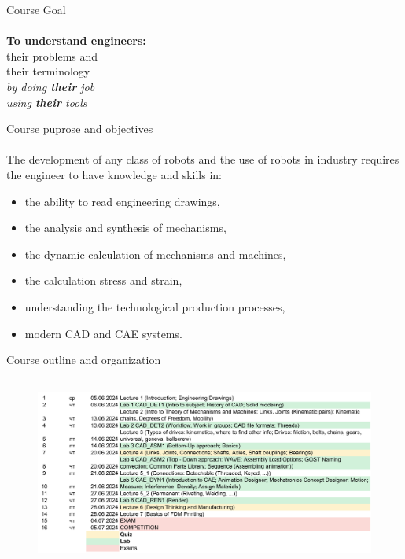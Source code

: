 \documentclass[aspectratio=169]{beamer}
\begin{document}
\begin{frame}[c]{Course Goal}
    \framesubtitle{}
    \centering \Large
    \textbf{To understand engineers:} \\
    their problems and \\
    their terminology \\
    \medskip
    \textit{by doing \textbf{their} job} \\
    \textit{using \textbf{their} tools}
\end{frame}

\begin{frame}[t]{Course puprose and objectives}
    \framesubtitle{}
    The development of any class of robots and the use of robots in industry requires the engineer to have knowledge and skills in:
    \begin{itemize}
        \item the ability to read engineering drawings,
        \item the analysis and synthesis of mechanisms,
        \item the dynamic calculation of mechanisms and machines,
        \item the calculation stress and strain,
        \item understanding the technological production processes,
        \item modern CAD and CAE systems.
    \end{itemize}
\end{frame}

\begin{frame}[t]{Course outline and organization}
    \framesubtitle{}
    \vspace{-0.6cm}
    \begin{figure}[H]
        \centering\includegraphics[height=6cm,width=1\textwidth,keepaspectratio]{topics.png}
        \label{fig:topics.png}
    \end{figure}
\end{frame}
\end{document}
